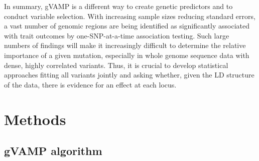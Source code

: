 
In summary, gVAMP is a different way to create genetic predictors and to conduct variable selection. With increasing sample sizes reducing standard errors, a vast number of genomic regions are being identified as significantly associated with trait outcomes by one-SNP-at-a-time association testing. Such large numbers of findings will make it increasingly difficult to determine the relative importance of a given mutation, especially in whole genome sequence data with dense, highly correlated variants. Thus, it is crucial to develop statistical approaches fitting all variants jointly and asking whether, given the LD structure of the data, there is evidence for an effect at each locus. 


\section{Methods}

\subsection{gVAMP algorithm}


